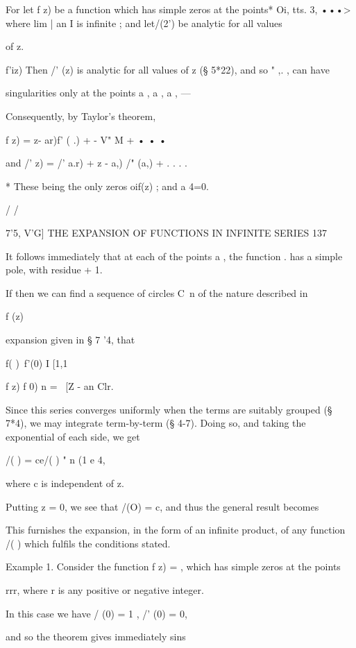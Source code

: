 For let f z) be a function which has simple zeros at the points* 
Oi, tts.  3, •••> where lim | an I is infinite ; and let/(2') be analytic for all values 

of z. 

f'iz) 
Then /' (z) is analytic for all values of z (§ 5*22), and so "   ,. , can have 

singularities only at the points a , a , a , — 

Consequently, by Taylor's theorem, 

f z) = z- ar)f' ( .) +  - V" M + • • • 

and /'  z) = /'  a.r) +  z - a,) /" (a,) + . . . . 

* These being the only zeros oif(z) ; and a 4=0. 

/ 
/ 



7'5, V'G] THE EXPANSION OF FUNCTIONS IN INFINITE SERIES 137 

It follows immediately that at each of the points a , the function . 
has a simple pole, with residue + 1. 

If then we can find a sequence of circles C\ n of the nature described in 

f (z) 

expansion given in § 7 '4, that 

f( )\ f'(0)   I [1,1 



f z) f 0) n = \ [Z - an Clr. 

Since this series converges uniformly when the terms are suitably grouped 
(§ 7*4), we may integrate term-by-term (§ 4-7). Doing so, and taking the 
exponential of each side, we get 

/( ) = ce/( ) " n (1 e 4, 

where c is independent of z. 

Putting z = 0, we see that /(O) = c, and thus the general result becomes 

This furnishes the expansion, in the form of an infinite product, of any 
function /( ) which fulfils the conditions stated. 

Example 1. Consider the function f z) = , which has simple zeros at the points 

rrr, where r is any positive or negative integer. 

In this case we have / (0) = 1 , /' (0) = 0, 

and so the theorem gives immediately 
sins 






